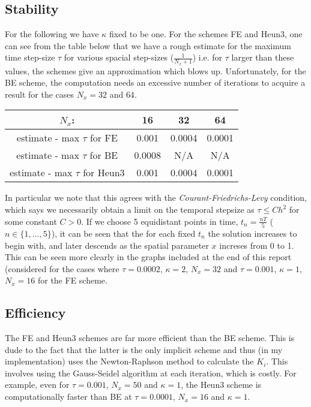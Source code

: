 \documentclass[10pt]{article}
\begin{document}
\subsection{Stability}
For the following we have $\kappa$ fixed to be one. For the schemes FE and Heun3, one can see from the table below that we have a rough estimate for the maximum time step-size $\tau$ for various spacial step-sizes ($\frac{1}{N_x+1}$) i.e. for $\tau$ larger than these values, the schemes give an approximation which blows up. Unfortunately, for the BE scheme, the computation needs an excessive number of iterations to acquire a result for the cases $N_x =32$ and $64$.
\begin{center}


    \begin{tabular}{|c||c|c|c|}
    \hline
        $N_x$:      & 16 & 32 & 64 \\
    \hline
       \hline
       estimate - max $\tau$ for FE  & 0.001 & 0.0004 & 0.0001    \\
       \hline
       estimate - max $\tau$ for BE  & 0.0008  & N/A& N/A  \\
        \hline
       estimate - max $\tau$ for Heun3 & 0.001 & 0.0004 & 0.0001 \\
       \hline
    \end{tabular}
\end{center}
In particular we note that this agrees with the \emph{Courant-Friedrichs-Levy} condition, which says we necessarily obtain a limit on the temporal stepsize as $\tau \leq Ch^2$ for some constant $C>0$. If we choose 5 equidistant points in time, $t_n = \frac{nT}{5}$ ($n \in \{1, \dots, 5\}$), it can be seen that the for each fixed $t_n$ the solution increases to begin with, and later descends as the spatial parameter $x$ increses from 0 to 1. This can be seen more clearly in the graphs included at the end of this report (considered for the cases where $\tau = 0.0002$, $\kappa = 2$, $N_x = 32$ and  $\tau = 0.001$, $\kappa = 1$, $N_x = 16$ for the FE scheme.

\subsection{Efficiency}
The FE and Heun3 schemes are far more efficient than the BE scheme. This is dude to the fact that the latter is the only implicit scheme and thus (in my implementation) uses the Newton-Raphson method to calculate the $K_i$. This involves using the Gauss-Seidel algorithm at each iteration, which is costly. For example, even for $\tau = 0.001$, $N_x = 50$ and $\kappa = 1$, the Heun3 scheme is computationally faster than BE at  $\tau = 0.0001$, $N_x = 16$ and $\kappa = 1$.
\end{document}
